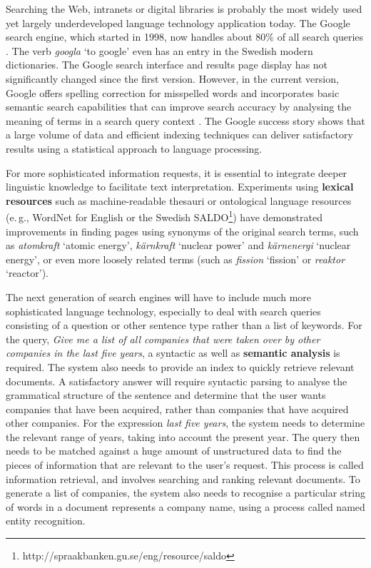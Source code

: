 \begin{multicols}{2}
Searching the Web, intranets or digital libraries is probably the most widely used yet largely underdeveloped language technology application today. The Google search engine, which started in 1998, now handles about 80\% of all search queries \cite{spi1}. The verb \textit{googla} `to google' even has an entry in the Swedish modern dictionaries. The Google search interface and results page display has not significantly changed since the first version. However, in the current version, Google offers spelling correction for misspelled words and incorporates basic semantic search capabilities that can improve search accuracy by analysing the meaning of terms in a search query context \cite{pc1}. The Google success story shows that a large volume of data and efficient indexing techniques can deliver satisfactory results using a statistical approach to language processing. 


For more sophisticated information requests, it is essential to
integrate deeper linguistic knowledge to facilitate text
interpretation. Experiments using \textbf{lexical resources} such as
machine-readable thesauri or ontological language resources (e.\,g.,
WordNet for English or the Swedish
SALDO\footnote{http://spraakbanken.gu.se/eng/resource/saldo}) have
demonstrated improvements in finding pages using synonyms of the
original search terms, such as \textit{atomkraft} `atomic energy',
\textit{kärnkraft} `nuclear power' and \textit{kärnenergi} `nuclear
energy', or even more loosely related terms (such as \textit{fission}
`fission' or \textit{reaktor} `reactor').

The next generation of search engines will have to include much more
sophisticated language technology, especially to deal with search
queries consisting of a question or other sentence type rather than a
list of keywords. For the query, \textit{Give me a list of all
  companies that were taken over by other companies in the last five
  years}, a syntactic as well as \textbf{semantic analysis} is
required. The system also needs to provide an index to quickly
retrieve relevant documents. A satisfactory answer will require
syntactic parsing to analyse the grammatical structure of the sentence
and determine that the user wants companies that have been acquired,
rather than companies that have acquired other companies. For the
expression \textit{last five years}, the system needs to determine the
relevant range of years, taking into account the present year. The
query then needs to be matched against a huge amount of unstructured
data to find the pieces of information that are relevant to the user’s
request. This process is called information retrieval, and involves
searching and ranking relevant documents. To generate a list of
companies, the system also needs to recognise a particular string of
words in a document represents a company name, using a process called
named entity recognition.


\end{multicols}
